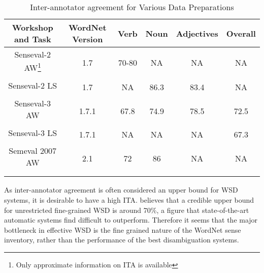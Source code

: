 \begin{center}
\begin{longtable}{| c | c | c | c | c | c |}      
    \hline
Workshop and Task & WordNet Version & Verb & Noun & Adjectives & Overall \\\hline 
Senseval-2 AW\footnote{Only approximate information on ITA is available} & \multirow{2}{*}{1.7} & \multirow{2}{*}{70-80} & \multirow{2}{*}{NA} & \multirow{2}{*}{NA} & \multirow{2}{*}{NA} \\ 
\citep{Senseval2AllWordsTask} & & & & & \\ \hline

Senseval-2 LS & \multirow{2}{*}{1.7} & \multirow{2}{*}{NA} & \multirow{2}{*}{86.3} & \multirow{2}{*}{83.4} & \multirow{2}{*}{NA} \\ 
\citep{Senseval2LexicalSampleTask} & & & & & \\ \hline

Senseval-3 AW  & \multirow{2}{*}{1.7.1} & \multirow{2}{*}{67.8} & \multirow{2}{*}{74.9} & \multirow{2}{*}{78.5} & \multirow{2}{*}{72.5}\\ 
\citep{Senseval3AllWordsTask} & & & & & \\ \hline

Senseval-3 LS & \multirow{2}{*}{1.7.1} & \multirow{2}{*}{NA} & \multirow{2}{*}{NA} & \multirow{2}{*}{NA} & \multirow{2}{*}{67.3}\\ 
\citep{Senseval3LexicalSample} & & & & & \\ \hline

Semeval 2007 AW & \multirow{2}{*}{2.1} & \multirow{2}{*}{72} & \multirow{2}{*}{86} & \multirow{2}{*}{NA} & \multirow{2}{*}{NA} \\ 
\citep{Semeval2007WSD} & & & & & \\ \hline
\caption{Inter-annotator agreement for Various Data Preparations} 
\label{tab:itaWSD}
\end{longtable}
\end{center}

As inter-annotator agreement is often considered an upper bound for WSD systems, it is desirable to have a high ITA. \citep{Navigli06meaningfulclustering} believes that a credible upper bound for unrestricted fine-grained WSD is around 70\%, a figure that state-of-the-art automatic systems find difficult to outperform. Therefore it seems that the major bottleneck in effective WSD is the fine grained nature of the WordNet sense inventory, rather than the performance of the best disambiguation systems.

